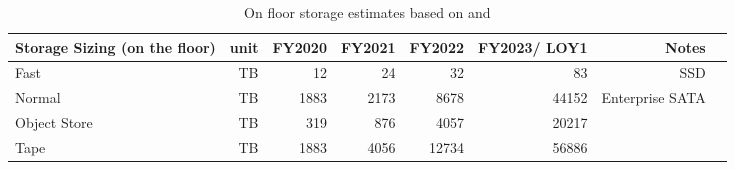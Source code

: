 \tiny \begin{longtable} { |p{}  |r  |r  |r  |r  |r  |r  |r |} 
\caption{On floor storage estimates based on  and 
 \label{tab:storageFloor}}\\ 
\hline 
{Storage Sizing (on the floor)}&{unit}&{FY2020}&{FY2021}&{FY2022}&{FY2023/ LOY1}&{Notes} \\ \hline
{Fast}&{TB}&{12}&{24}&{32}&{83}&{SSD} \\ \hline
{Normal}&{TB}&{1883}&{2173}&{8678}&{44152}&{Enterprise SATA} \\ \hline
{Object Store}&{TB}&{319}&{876}&{4057}&{20217}& \\ \hline
{Tape}&{TB}&{1883}&{4056}&{12734}&{56886}& \\ \hline
\end{longtable} \normalsize
